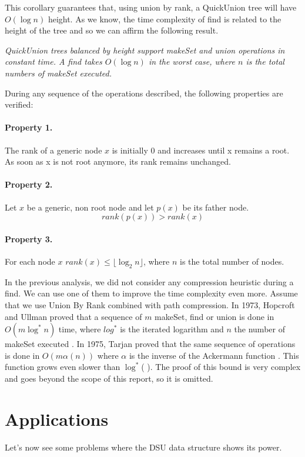\documentclass{article}
\begin{document}
\bigskip

This corollary guarantees that, using union by rank, a QuickUnion tree will have $O(\log n)$ height. As we know, the time complexity of find
is related to the height of the tree and so we can affirm the following result.

\bigskip

\emph{QuickUnion trees balanced by height support makeSet and union operations in constant time. A find takes $O(\log n)$
in the worst case, where $n$ is the total numbers of makeSet executed.}

During any sequence of the operations described, the following properties are verified:
\paragraph{Property 1.} The rank of a generic node $x$ is initially 0 and increases until x remains a root. As soon as x is not root anymore, its rank
remains unchanged.
\paragraph{Property 2.} Let $x$ be a generic, non root node and let $p(x)$ be its father node.
$$rank(p(x)) > rank(x)$$ 
\paragraph{Property 3.} For each node $x$ $ rank(x) \leq \lfloor \log_2 n \rfloor$, where $n$ is the total number of nodes.

\bigskip

In the previous analysis, we did not  consider any compression heuristic during a find. We can use one of them to improve the time complexity
even more. 
Assume that we use Union By Rank combined with path compression.
In 1973, Hopcroft and Ullman proved that a sequence of $m$ makeSet, find or  union is done in $O(m\log^* n)$ time, where $log^*$ is the iterated
logarithm and $n$ the number of makeSet executed \cite{hopcroft1973set}. In 1975, Tarjan proved that the same sequence of operations
is done in $O(m\alpha(n))$ where $\alpha$ is the inverse of the Ackermann function \cite{tarjan1975efficiency}. This function grows even slower than $\log^*$( ).
The proof of this bound is very complex and goes beyond the scope of this report, so it is omitted.  
\section{Applications}
Let's now see some problems where the DSU data structure shows its power.
\end{document}
